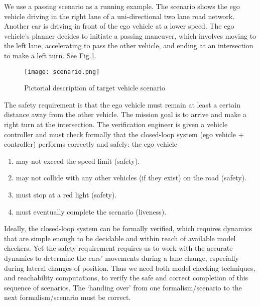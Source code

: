 \begin{exmp}
	We use a passing scenario as a running example.
	The scenario shows the ego vehicle driving in the right lane of a uni-directional two lane road network. 
	Another car is driving in front of the ego vehicle at a lower speed.
	The ego vehicle's planner decides to initiate a passing maneuver, which involves moving to the left lane, accelerating to pass the other vehicle, and ending at an intersection to make a left turn.
	See Fig.\ref{fig:scenario}.	
	\begin{figure}[tb]
		\label{fig:scenario}
		\texttt{[image: scenario.png]}
		\caption{Pictorial description of target vehicle scenario}
	\end{figure}
	The safety requirement is that the ego vehicle must remain at least a certain distance away from the other vehicle.
	The mission goal is to arrive and make a right turn at the intersection.
	The verification engineer is given a vehicle controller and must check formally that the closed-loop system (ego vehicle + controller) performs correctly and safely: the ego vehicle
	\begin{enumerate}
		\item may not exceed the speed limit (safety).
		\item may not collide with any other vehicles (if they exist) on the road (safety).
		\item must stop at a red light (safety).
		\item must eventually complete the scenario (liveness).
	\end{enumerate}
	Ideally, the closed-loop system can be formally verified, which requires dynamics that are simple enough to be decidable and within reach of available model checkers.
	Yet the safety requirement requires us to work with the accurate dynamics to determine the cars' movements during a lane change, especially during lateral changes of position. 
	Thus we need both model checking techniques, and reachability computations, to verify the safe and correct completion of this sequence of scenarios.
	The `handing over' from one formalism/scenario to the next formalism/scenario must be correct.
\end{exmp}

